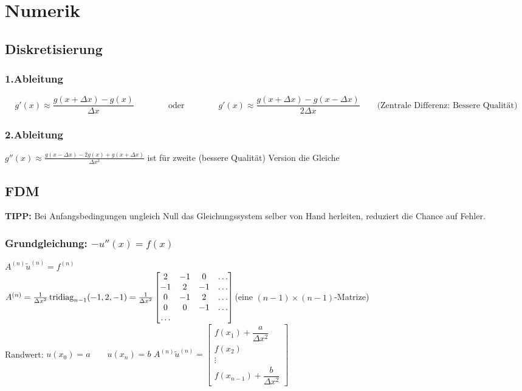 
\section{Numerik}
\subsection{Diskretisierung}
\subsubsection{1.Ableitung}

$$g'(x)\approx \frac{g(x+\Delta x)-g(x)}{\Delta x} \qquad\qquad \text{oder}
  \qquad\qquad \boxed{g'(x)\approx \frac{g(x+\Delta x)-g(x-\Delta x)}{2\Delta
      x}}\qquad \text{(Zentrale Differenz: Bessere Qualität)}$$
\subsubsection{2.Ableitung}
$\boxed{g''(x)\approx \frac{g(x-\Delta x)-2 g(x) + g(x+ \Delta x)}{\Delta x^2}}$ ist für zweite (bessere Qualität) Version die Gleiche

\subsection{FDM}
\textbf{TIPP:} Bei Anfangsbedingungen ungleich Null das Gleichungssystem selber von Hand herleiten, reduziert die Chance auf Fehler.
\subsubsection{Grundgleichung: $-u''(x)=f(x)$}
$ A^{(n)} \tilde{u}^{(n)} =f^{(n)}   $\\
$A^{(n)}= \frac{1}{\Delta x^2} \operatorname{tridiag}_{n-1} (-1,2,-1) = \frac{1}{\Delta x^2}
  \begin{bmatrix}
    2  & -1 & 0  & \ldots \\
    -1 & 2  & -1 & \ldots \\
    0  & -1 & 2  & \ldots \\
    0  & 0  & -1 & \ldots \\
    \ldots
  \end{bmatrix}$\qquad (eine $(n-1)\times(n-1)$-Matrize)\\
Randwert: $u(x_0)= a \qquad u(x_n)=b $ \qquad
$A^{(n)}\tilde{u}^{(n)} =\begin{bmatrix}
    f(x_1) + \dfrac{a}{\Delta x^2} \\
    f(x_2)                         \\
    \vdots                         \\
    f(x_{n-1}) + \dfrac{b}{\Delta x^2}
  \end{bmatrix} $\\
